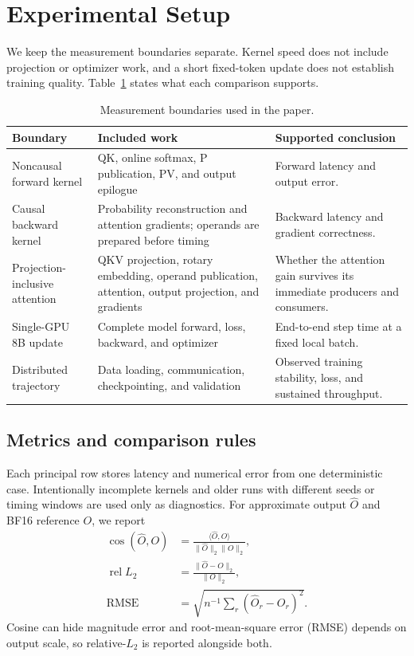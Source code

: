 \section{Experimental Setup}

We keep the measurement boundaries separate.  Kernel speed does not include
projection or optimizer work, and a short fixed-token update does not establish
training quality.  Table~\ref{tab:measurement-boundaries} states what each
comparison supports.

\begin{table}[htbp]
\centering
\caption{Measurement boundaries used in the paper.}
\label{tab:measurement-boundaries}
\small
\begin{tabularx}{\textwidth}{p{}p{}X}
\toprule
Boundary & Included work & Supported conclusion \\
\midrule
Noncausal forward kernel & QK, online softmax, P publication, PV, and output
epilogue & Forward latency and output error. \\
Causal backward kernel & Probability reconstruction and attention gradients;
operands are prepared before timing & Backward latency and gradient
correctness. \\
Projection-inclusive attention & QKV projection, rotary embedding, operand
publication, attention, output projection, and gradients & Whether the
attention gain survives its immediate producers and consumers. \\
Single-GPU 8B update & Complete model forward, loss, backward, and optimizer &
End-to-end step time at a fixed local batch. \\
Distributed trajectory & Data loading, communication, checkpointing, and
validation & Observed training stability, loss, and sustained throughput. \\
\bottomrule
\end{tabularx}
\end{table}

\subsection{Metrics and comparison rules}

Each principal row stores latency and numerical error from one deterministic
case. Intentionally incomplete kernels and older runs with different seeds or
timing windows are used only as diagnostics. For approximate output
$\widehat O$ and BF16 reference $O$, we report
\begin{align}
  \operatorname{cos}(\widehat O,O)
    &=\frac{\langle\widehat O,O\rangle}
      {\lVert\widehat O\rVert_2\lVert O\rVert_2}, \\
  \operatorname{rel}L_2
    &=\frac{\lVert\widehat O-O\rVert_2}{\lVert O\rVert_2}, \\
  \operatorname{RMSE}
    &=\sqrt{n^{-1}\sum_r(\widehat O_r-O_r)^2}.
\end{align}
Cosine can hide magnitude error and root-mean-square error (RMSE) depends on
output scale, so relative-$L_2$ is reported alongside both.

